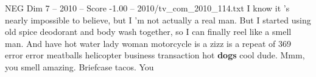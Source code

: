 \begin{textsample}{NEG Dim 7 – 2010 – Score -1.00 – 2010/tv\_com\_2010\_114.txt}  \label{ex:f7_neg_018}
I know it 's nearly impossible to believe, but I 'm not actually a real man.
But I started using old spice deodorant and body wash together, so I can finally reel like a smell man.
And have hot water lady woman motorcycle is a zizz is a repeat of 369 error error meatballs helicopter business transaction hot \textbf{dogs} cool dude.
Mmm, you smell amazing.
Briefcase tacos.
You

\end{textsample}
